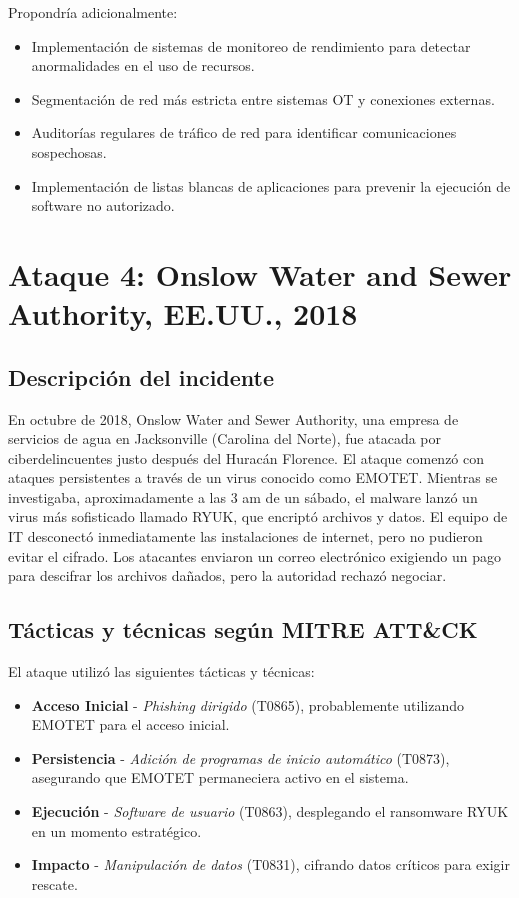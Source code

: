 Propondría adicionalmente:

\begin{itemize}
    \item Implementación de sistemas de monitoreo de rendimiento para detectar anormalidades en el uso de recursos.
    \item Segmentación de red más estricta entre sistemas OT y conexiones externas.
    \item Auditorías regulares de tráfico de red para identificar comunicaciones sospechosas.
    \item Implementación de listas blancas de aplicaciones para prevenir la ejecución de software no autorizado.
\end{itemize}

\section{Ataque 4: Onslow Water and Sewer Authority, EE.UU., 2018}

\subsection{Descripción del incidente}
En octubre de 2018, Onslow Water and Sewer Authority, una empresa de servicios de agua en Jacksonville (Carolina del Norte), fue atacada por ciberdelincuentes justo después del Huracán Florence. El ataque comenzó con ataques persistentes a través de un virus conocido como EMOTET. Mientras se investigaba, aproximadamente a las 3 am de un sábado, el malware lanzó un virus más sofisticado llamado RYUK, que encriptó archivos y datos. El equipo de IT desconectó inmediatamente las instalaciones de internet, pero no pudieron evitar el cifrado. Los atacantes enviaron un correo electrónico exigiendo un pago para descifrar los archivos dañados, pero la autoridad rechazó negociar.

\subsection{Tácticas y técnicas según MITRE ATT\&CK}
El ataque utilizó las siguientes tácticas y técnicas:

\begin{itemize}
    \item \textbf{Acceso Inicial} - \textit{Phishing dirigido} (T0865), probablemente utilizando EMOTET para el acceso inicial.
    
    \item \textbf{Persistencia} - \textit{Adición de programas de inicio automático} (T0873), asegurando que EMOTET permaneciera activo en el sistema.
    
    \item \textbf{Ejecución} - \textit{Software de usuario} (T0863), desplegando el ransomware RYUK en un momento estratégico.
    
    \item \textbf{Impacto} - \textit{Manipulación de datos} (T0831), cifrando datos críticos para exigir rescate.
\end{itemize}

